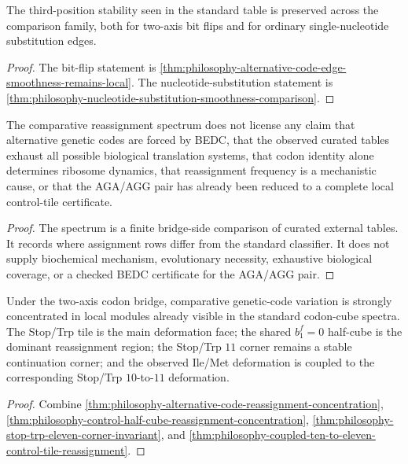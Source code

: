 \begin{corollary}
\label{cor:philosophy-third-position-stability-family-level}
The third-position stability seen in the standard table is preserved
across the comparison family, both for two-axis bit flips and for
ordinary single-nucleotide substitution edges.
\end{corollary}
\begin{proof}
The bit-flip statement is
\autoref{thm:philosophy-alternative-code-edge-smoothness-remains-local}.
The nucleotide-substitution statement is
\autoref{thm:philosophy-nucleotide-substitution-smoothness-comparison}.
\end{proof}

\begin{theorem}
\label{thm:philosophy-comparative-tile-dynamics-cannot-claim-boundary}
The comparative reassignment spectrum does not license any claim that
alternative genetic codes are forced by BEDC, that the observed
curated tables exhaust all possible biological translation systems, that
codon identity alone determines ribosome dynamics, that reassignment
frequency is a mechanistic cause, or that the AGA/AGG pair has already
been reduced to a complete local control-tile certificate.
\end{theorem}
\begin{proof}
The spectrum is a finite bridge-side comparison of curated external
tables. It records where assignment rows differ from the standard
classifier. It does not supply biochemical mechanism, evolutionary
necessity, exhaustive biological coverage, or a checked BEDC certificate
for the AGA/AGG pair.
\end{proof}

\begin{corollary}
\label{cor:philosophy-comparative-tile-dynamics-allowed-claim}
Under the two-axis codon bridge, comparative genetic-code variation is
strongly concentrated in local modules already visible in the standard
codon-cube spectra. The Stop/Trp tile is the main deformation face;
the shared $b_{1}^{f}=0$ half-cube is the dominant reassignment region;
the Stop/Trp $11$ corner remains a stable continuation corner; and the
observed Ile/Met deformation is coupled to the corresponding Stop/Trp
$10$-to-$11$ deformation.
\end{corollary}
\begin{proof}
Combine
\autoref{thm:philosophy-alternative-code-reassignment-concentration},
\autoref{thm:philosophy-control-half-cube-reassignment-concentration},
\autoref{thm:philosophy-stop-trp-eleven-corner-invariant}, and
\autoref{thm:philosophy-coupled-ten-to-eleven-control-tile-reassignment}.
\end{proof}


